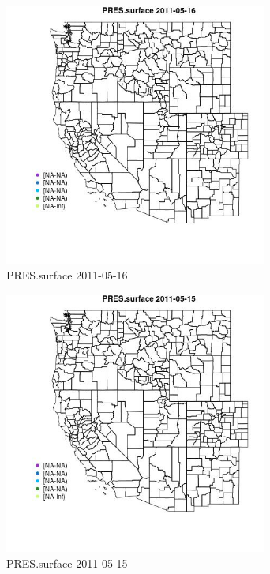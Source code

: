 \begin{figure} 
\centering  
\includegraphics[width=0.77\textwidth]{Code_Outputs/ML_input_report_ML_input_PM25_Step5_part_d_de_duplicated_aves_ML_input_MapObsPRESsurface2011-05-16.jpg} 
\caption{\label{fig:ML_input_report_ML_input_PM25_Step5_part_d_de_duplicated_aves_ML_inputMapObsPRESsurface2011-05-16}PRES.surface 2011-05-16} 
\end{figure} 
 

\begin{figure} 
\centering  
\includegraphics[width=0.77\textwidth]{Code_Outputs/ML_input_report_ML_input_PM25_Step5_part_d_de_duplicated_aves_ML_input_MapObsPRESsurface2011-05-15.jpg} 
\caption{\label{fig:ML_input_report_ML_input_PM25_Step5_part_d_de_duplicated_aves_ML_inputMapObsPRESsurface2011-05-15}PRES.surface 2011-05-15} 
\end{figure} 
 


